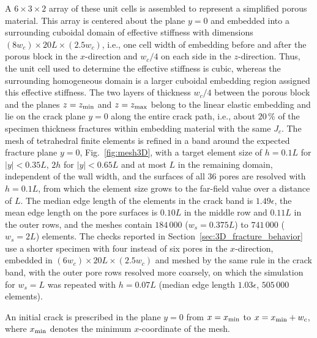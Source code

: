\documentclass[pdflatex,sn-mathphys-num]{sn-jnl}%
\theoremstyle{thmstyleone}%
\theoremstyle{thmstyletwo}%
\theoremstyle{thmstylethree}%
\begin{document}
A $6\times3\times2$ array of these unit cells is assembled to represent a simplified porous material. This array is centered about the plane $y=0$ and embedded into a surrounding cuboidal domain of effective stiffness with dimensions $(8 w_c)\times 20L \times (2.5 w_c)$, i.e., one cell width of embedding before and after the porous block in the $x$-direction and $w_c/4$ on each side in the $z$-direction. Thus, the unit cell used to determine the effective stiffness is cubic, whereas the surrounding homogeneous domain is a larger cuboidal embedding region assigned this effective stiffness. The two layers of thickness $w_c/4$ between the porous block and the planes $z = z_{\rm min}$ and $z = z_{\rm max}$ belong to the linear elastic embedding and lie on the crack plane $y = 0$ along the entire crack path, i.e., about $20\,\%$ of the specimen thickness fractures within embedding material with the same $J_c$. The mesh of tetrahedral finite elements is refined in a band around the expected fracture plane $y=0$, Fig.~\ref{fig:mesh3D}, with a target element size of $h = 0.1L$ for $|y| < 0.35L$, $2h$ for $|y| < 0.65L$ and at most $L$ in the remaining domain, independent of the wall width, and the surfaces of all 36 pores are resolved with $h = 0.1L$, from which the element size grows to the far-field value over a distance of $L$. The median edge length of the elements in the crack band is $1.49\epsilon$, the mean edge length on the pore surfaces is $0.10L$ in the middle row and $0.11L$ in the outer rows, and the meshes contain $184\,000$ ($w_s = 0.375L$) to $741\,000$ ($w_s = 2L$) elements. The checks reported in Section~\ref{sec:3D_fracture_behavior} use a shorter specimen with four instead of six pores in the $x$-direction, embedded in $(6 w_c)\times 20L \times (2.5 w_c)$ and meshed by the same rule in the crack band, with the outer pore rows resolved more coarsely, on which the simulation for $w_s = L$ was repeated with $h = 0.07L$ (median edge length $1.03\epsilon$, $505\,000$ elements).

An initial crack is prescribed in the plane $y=0$ from $x=x_{\rm min}$ to $x=x_{\rm min}+w_c$, where $x_{\rm min}$ denotes the minimum $x$-coordinate of the mesh. 
\end{document}
